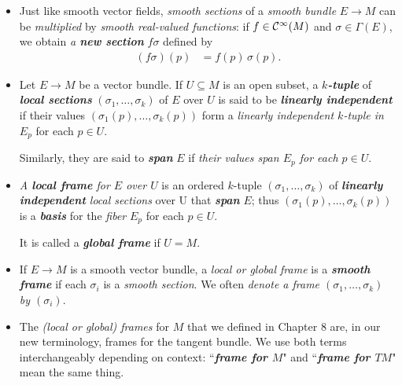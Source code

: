 \documentclass[11pt]{article}
\begin{document}
\begin{itemize}
\item \begin{remark}
Just like smooth vector fields, \emph{smooth sections} of a \emph{smooth bundle} $E \rightarrow M$  can be \emph{multiplied} by \emph{smooth real-valued functions}: if $f \in {\mathcal C}^{\infty}(M)$ and $\sigma \in \Gamma(E)$, we obtain \emph{a \textbf{new section}} $f\sigma$ defined by
\begin{align*}
(f\sigma)(p) &= f(p)\,\sigma(p).
\end{align*}
\end{remark}

\item \begin{definition}
Let $E \rightarrow M$ be a vector bundle. If $U \subseteq M$ is an open subset, a \emph{\textbf{$k$-tuple}} of \emph{\textbf{local sections}} $(\sigma_1,\ldots, \sigma_k)$ of $E$ over $U$ is said to be \emph{\textbf{linearly independent}} if their values $(\sigma_1(p),\ldots, \sigma_k(p))$ form a \emph{linearly independent $k$-tuple in $E_p$} for each $p\in U$. 

Similarly, they are said to \emph{\textbf{span}} $E$ if \emph{their values span $E_p$ for each $p \in U$}.
\end{definition}

\item \begin{definition}
\emph{A \textbf{local frame} for $E$ over $U$} is an ordered $k$-tuple $(\sigma_1,\ldots, \sigma_k)$ of \emph{\textbf{linearly independent} local sections} over U that \emph{\textbf{span}} $E$; thus $(\sigma_1(p),\ldots, \sigma_k(p))$ is a \emph{\textbf{basis}} for the \emph{fiber} $E_p$ for each $p \in U$. 

It is called a \emph{\textbf{global frame}} if $U = M$. 
\end{definition}


\item \begin{definition}
If  $E \rightarrow M$ is a smooth vector bundle, a \emph{local or global frame} is a \emph{\textbf{smooth frame}} if each $\sigma_i$ is a \emph{smooth section}. We often\emph{ denote a frame $(\sigma_1,\ldots, \sigma_k)$ by $(\sigma_i)$}.
\end{definition}


\item \begin{remark}
The \emph{(local or global) frames} for $M$ that we defined in Chapter 8 are, in our new terminology, frames for the tangent bundle. We use both terms interchangeably
depending on context: ``\emph{\textbf{frame for $M$}}" and ``\emph{\textbf{frame for $TM$}}" mean the same thing.
\end{remark}


\end{itemize}
\end{document}
